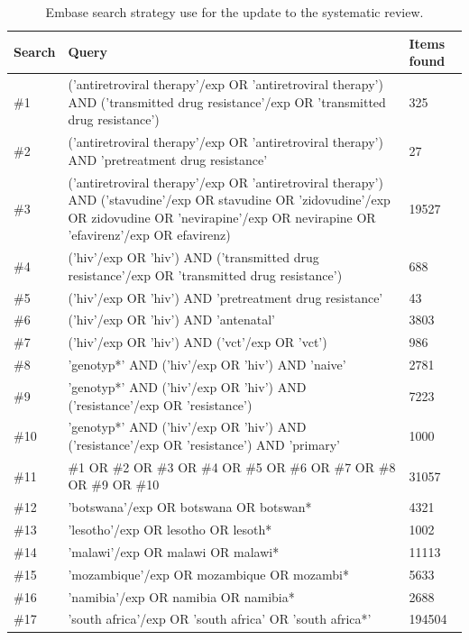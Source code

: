 \documentclass{article}
\begin{document}
	\begin{table}[h]
		\caption{Embase search strategy use for the update to the systematic review.}
		\label{tab:embase}
		\centering
		\begin{tabular}{lp{12cm}l}
			\hline
			Search & Query        & Items found \\
			\hline
			\#1 & ('antiretroviral therapy'/exp OR 'antiretroviral therapy') AND ('transmitted drug resistance'/exp OR 'transmitted drug resistance')    & 325  \\
			\#2 & ('antiretroviral therapy'/exp OR 'antiretroviral therapy') AND 'pretreatment drug resistance'     & 27  \\
			\#3 & ('antiretroviral therapy'/exp OR 'antiretroviral therapy') AND ('stavudine'/exp OR stavudine OR 'zidovudine'/exp OR zidovudine OR 'nevirapine'/exp OR nevirapine OR 'efavirenz'/exp OR efavirenz) & 19527 \\
			\#4 & ('hiv'/exp OR 'hiv') AND ('transmitted drug resistance'/exp OR 'transmitted drug resistance')     & 688  \\
			\#5 & ('hiv'/exp OR 'hiv') AND 'pretreatment drug resistance'      & 43  \\
			\#6 & ('hiv'/exp OR 'hiv') AND 'antenatal'        & 3803 \\
			\#7 & ('hiv'/exp OR 'hiv') AND ('vct'/exp OR 'vct')       & 986  \\
			\#8 & 'genotyp*' AND ('hiv'/exp OR 'hiv') AND 'naive'       & 2781 \\
			\#9 & 'genotyp*' AND ('hiv'/exp OR 'hiv') AND ('resistance'/exp OR 'resistance')     & 7223 \\
			\#10 & 'genotyp*' AND ('hiv'/exp OR 'hiv') AND ('resistance'/exp OR 'resistance') AND 'primary'      & 1000 \\
			\#11 & \#1 OR \#2 OR \#3 OR \#4 OR \#5 OR \#6 OR \#7 OR \#8 OR \#9 OR \#10      & 31057 \\
			\#12 & 'botswana'/exp OR botswana OR botswan*        & 4321 \\
			\#13 & 'lesotho'/exp OR lesotho OR lesoth*        & 1002 \\
			\#14 & 'malawi'/exp OR malawi OR malawi*       & 11113 \\
			\#15 & 'mozambique'/exp OR mozambique OR mozambi*       & 5633 \\
			\#16 & 'namibia'/exp OR namibia OR namibia*        & 2688 \\
			\#17 & 'south africa'/exp OR 'south africa' OR 'south africa*'      & 194504 \\

\end{tabular}
\end{table}
\end{document}
